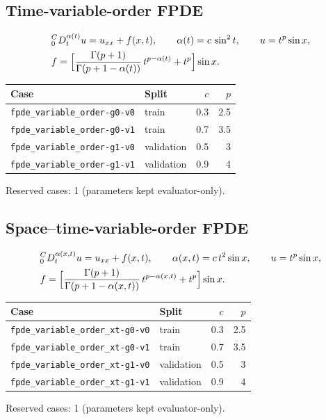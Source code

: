 \documentclass[11pt]{article}
\newcommand{\Caputo}[1]{{}^{C}_{0}D_t^{#1}}
\begin{document}
\subsection{Time-variable-order FPDE}
\begin{align*}
&\Caputo{\alpha(t)}u = u_{xx} + f(x,t),\qquad \alpha(t)=c\,\sin^2 t,\qquad u=t^{p}\sin x,\\
&f=\Bigl[\frac{\Gamma(p+1)}{\Gamma(p+1-\alpha(t))}\,t^{p-\alpha(t)} + t^{p}\Bigr]\sin x.
\end{align*}

\begin{center}\small
\begin{tabular}{llrr}
\toprule
Case & Split & $c$ & $p$ \\
\midrule
\texttt{fpde\_variable\_order-g0-v0} & train & 0.3 & 2.5 \\
\texttt{fpde\_variable\_order-g0-v1} & train & 0.7 & 3.5 \\
\texttt{fpde\_variable\_order-g1-v0} & validation & 0.5 & 3 \\
\texttt{fpde\_variable\_order-g1-v1} & validation & 0.9 & 4 \\
\bottomrule
\end{tabular}
\end{center}
\noindent Reserved cases: 1 (parameters kept evaluator-only).

\subsection{Space--time-variable-order FPDE}
\begin{align*}
&\Caputo{\alpha(x,t)}u = u_{xx} + f(x,t),\qquad \alpha(x,t)=c\,t^{2}\sin x,\qquad u=t^{p}\sin x,\\
&f=\Bigl[\frac{\Gamma(p+1)}{\Gamma(p+1-\alpha(x,t))}\,t^{p-\alpha(x,t)} + t^{p}\Bigr]\sin x.
\end{align*}

\begin{center}\small
\begin{tabular}{llrr}
\toprule
Case & Split & $c$ & $p$ \\
\midrule
\texttt{fpde\_variable\_order\_xt-g0-v0} & train & 0.3 & 2.5 \\
\texttt{fpde\_variable\_order\_xt-g0-v1} & train & 0.7 & 3.5 \\
\texttt{fpde\_variable\_order\_xt-g1-v0} & validation & 0.5 & 3 \\
\texttt{fpde\_variable\_order\_xt-g1-v1} & validation & 0.9 & 4 \\
\bottomrule
\end{tabular}
\end{center}
\noindent Reserved cases: 1 (parameters kept evaluator-only).
\end{document}
